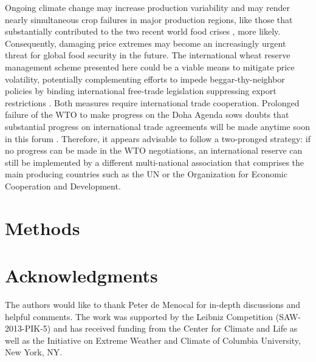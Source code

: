 \documentclass[12pt]{article}
\begin{document}
Ongoing climate change may increase production variability \cite{WHE13} and may render nearly simultaneous crop failures in major production regions, like those that substantially contributed to the two recent world food crises \cite{ASS11,CHA14}, more likely. Consequently, damaging price extremes may become an increasingly urgent threat for global food security in the future. The international wheat reserve management scheme presented here could be a viable means to mitigate price volatility, potentially complementing efforts to impede beggar-thy-neighbor policies by binding international free-trade legislation suppressing export restrictions \cite{ANA13}. Both measures require international trade cooperation. Prolonged failure of the WTO to make progress on the Doha Agenda sows doubts that substantial progress on international trade agreements will be made anytime soon in this forum \cite{HLPE11}. Therefore, it appears advisable to follow a two-pronged strategy: if no progress can be made in the WTO negotiations, an international reserve can still be implemented by a different multi-national association that comprises the main producing countries such as the UN or the Organization for Economic Cooperation and Development.

\section*{Methods}%





\section*{Acknowledgments}
The authors would like to thank Peter de Menocal for in-depth discussions and helpful comments. The
work was supported by the Leibniz Competition (SAW-2013-PIK-5) and has received funding from the
Center for Climate and Life as well as the Initiative on Extreme Weather and Climate of Columbia
University, New York, NY.
\end{document}

